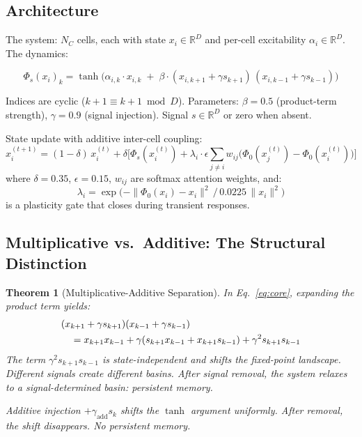 \documentclass[11pt,a4paper]{article}
\newtheorem{theorem}{Theorem}
\DeclareMathOperator{\tmark}{tanh}
\begin{document}
\subsection{Architecture}

The system: $N_C$ cells, each with state $x_i \in \mathbb{R}^D$ and per-cell excitability $\alpha_i \in \mathbb{R}^D$. The dynamics:

\begin{equation}
\label{eq:core}
\boxed{
\Phi_s(x_i)_k = \tmark\!\Big(\alpha_{i,k} \cdot x_{i,k} \;+\; \beta \cdot (x_{i,k{+}1} + \gamma s_{k{+}1})\,(x_{i,k{-}1} + \gamma s_{k{-}1})\Big)
}
\end{equation}

Indices are cyclic ($k{+}1 \equiv k{+}1 \bmod D$). Parameters: $\beta{=}0.5$ (product-term strength), $\gamma{=}0.9$ (signal injection). Signal $s \in \mathbb{R}^D$ or zero when absent.

State update with additive inter-cell coupling:
\begin{equation}
\label{eq:update}
x_i^{(t+1)} = (1{-}\delta)\,x_i^{(t)} + \delta\Big[\Phi_s(x_i^{(t)}) + \lambda_i \cdot \epsilon \sum_{j \neq i} w_{ij}\big(\Phi_0(x_j^{(t)}) - \Phi_0(x_i^{(t)})\big)\Big]
\end{equation}
where $\delta{=}0.35$, $\epsilon{=}0.15$, $w_{ij}$ are softmax attention weights, and:
\begin{equation}
\lambda_i = \exp\!\Big({-\|\Phi_0(x_i) - x_i\|^2}\,\big/\,{0.0225\,\|x_i\|^2}\Big)
\end{equation}
is a plasticity gate that closes during transient responses.

\subsection{Multiplicative vs.\ Additive: The Structural Distinction}

\begin{theorem}[Multiplicative-Additive Separation]
\label{thm:sep}
In Eq.~\eqref{eq:core}, expanding the product term yields:
\begin{align}
&(x_{k{+}1} + \gamma s_{k{+}1})(x_{k{-}1} + \gamma s_{k{-}1}) \notag\\
&\quad= x_{k{+}1}x_{k{-}1} + \gamma(s_{k{+}1}x_{k{-}1} + x_{k{+}1}s_{k{-}1}) + \gamma^2 s_{k{+}1}s_{k{-}1}
\end{align}
The term $\gamma^2 s_{k{+}1}s_{k{-}1}$ is state-independent and shifts the fixed-point landscape. Different signals create different basins. After signal removal, the system relaxes to a signal-determined basin: persistent memory.

Additive injection $+\gamma_{\mathrm{add}}s_k$ shifts the $\tmark$ argument uniformly. After removal, the shift disappears. No persistent memory.
\end{theorem}
\end{document}
